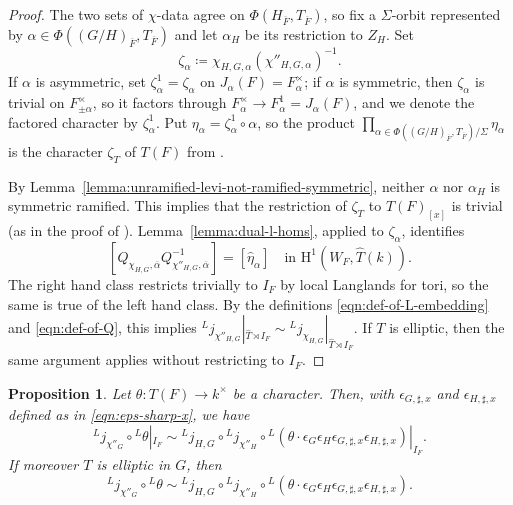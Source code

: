 \documentclass[reqno]{amsart}
\numberwithin{equation}{subsection}
\newcommand{\ol}[1]{\overline{#1}}
\newcommand{\wh}[1]{\widehat{#1}}
\newcommand{\co}{\colon}
\newcommand{\ld}{{}^L}
\newcommand{\rH}{\ensuremath{\mathrm{H}}\xspace}
\newtheorem{prop}[thm]{Proposition}
\theoremstyle{remark}
\numberwithin{equation}{subsection}
\numberwithin{figure}{subsection}
\begin{document}
\begin{proof}
The two sets of $\chi$-data agree on $\Phi(H_{\ol F},T_{\ol F})$, so fix a $\Sigma$-orbit represented by $\alpha\in\Phi((G/H)_{\ol F},T_{\ol F})$ and let $\alpha_H$ be its restriction to $Z_H$. Set
\[
\zeta_\alpha\coloneqq\chi_{H,G,\alpha}(\chi''_{H,G,\alpha})^{-1}.
\]
If $\alpha$ is asymmetric, set $\zeta_\alpha^1=\zeta_\alpha$ on $J_\alpha(F)=F_\alpha^\times$; if $\alpha$ is symmetric, then $\zeta_\alpha$ is trivial on $F_{\pm\alpha}^\times$, so it factors through $F_\alpha^\times\to F_\alpha^1=J_\alpha(F)$, and we denote the factored character by $\zeta_\alpha^1$. Put $\eta_\alpha = \zeta_\alpha^1\circ\alpha$, so the product $\prod_{\alpha \in \Phi((G/H)_{\ol F}, T_{\ol F})/\Sigma} \eta_\alpha$ is the character $\zeta_T$ of $T(F)$ from \cite[\S 3.2]{Kal21a}.

By Lemma~\ref{lemma:unramified-levi-not-ramified-symmetric}, neither $\alpha$ nor $\alpha_H$ is symmetric ramified. This implies that the restriction of $\zeta_T$ to $T(F)_{[x]}$ is trivial (as in the proof of \cite[Proposition 5.27]{Kal21a}). Lemma~\ref{lemma:dual-l-homs}, applied to $\zeta_\alpha$, identifies
\[
[Q_{\chi_{H,G},\ol\alpha}Q_{\chi''_{H,G},\ol\alpha}^{-1}]
=[\wh\eta_\alpha]
\quad\text{in }\rH^1(W_F, \wh T(k)).
\]
The right hand class restricts trivially to $I_F$ by local Langlands for tori, so the same is true of the left hand class. By the definitions \eqref{eqn:def-of-L-embedding} and \eqref{eqn:def-of-Q}, this implies
$\ld j_{\chi''_{H,G}}|_{\wh T\rtimes I_F}\sim
\ld j_{\chi_{H,G}}|_{\wh T\rtimes I_F}$. If $T$ is elliptic, then the same argument applies without restricting to $I_F$.
\end{proof}

\begin{prop}\label{prop:fks-and-tasho-cancel}
Let $\theta\co T(F) \to k^\times$ be a character. Then, with $\epsilon_{G,\sharp,x}$ and $\epsilon_{H,\sharp,x}$ defined as in \eqref{eqn:eps-sharp-x}, we have
\[
\ld j_{\chi''_G} \circ \ld\theta|_{I_F} \sim \ld j_{H,G} \circ \ld j_{\chi''_H} \circ \ld(\theta \cdot \epsilon_G\epsilon_H\epsilon_{G,\sharp,x}\epsilon_{H,\sharp,x})|_{I_F}.
\]
If moreover $T$ is elliptic in $G$, then
\[
\ld j_{\chi''_G} \circ \ld\theta \sim \ld j_{H,G} \circ \ld j_{\chi''_H} \circ \ld(\theta \cdot \epsilon_G\epsilon_H\epsilon_{G,\sharp,x}\epsilon_{H,\sharp,x}).
\]
\end{prop}
\end{document}
